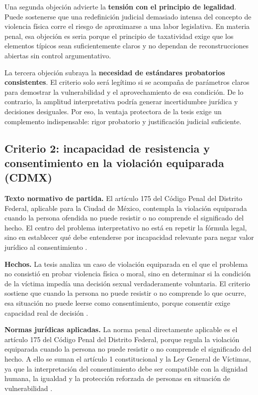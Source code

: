 \documentclass[
	spanish,
	letterpaper, oneside
]{article}
\begin{document}
Una segunda objeción advierte la \textbf{tensión con el principio de legalidad}. Puede sostenerse que una redefinición judicial demasiado intensa del concepto de violencia física corre el riesgo de aproximarse a una labor legislativa. En materia penal, esa objeción es seria porque el principio de taxatividad exige que los elementos típicos sean suficientemente claros y no dependan de reconstrucciones abiertas sin control argumentativo.

La tercera objeción subraya la \textbf{necesidad de estándares probatorios consistentes}. El criterio solo será legítimo si se acompaña de parámetros claros para demostrar la vulnerabilidad y el aprovechamiento de esa condición. De lo contrario, la amplitud interpretativa podría generar incertidumbre jurídica y decisiones desiguales. Por eso, la ventaja protectora de la tesis exige un complemento indispensable: rigor probatorio y justificación judicial suficiente.

\subsection{Criterio 2: incapacidad de resistencia y consentimiento en la violación equiparada (CDMX)}

\textbf{Texto normativo de partida.} El artículo 175 del Código Penal del Distrito Federal, aplicable para la Ciudad de México, contempla la violación equiparada cuando la persona ofendida no puede resistir o no comprende el significado del hecho. El centro del problema interpretativo no está en repetir la fórmula legal, sino en establecer qué debe entenderse por incapacidad relevante para negar valor jurídico al consentimiento \citep{scjnIncapacidadResistencia2019}.

\textbf{Hechos.} La tesis analiza un caso de violación equiparada en el que el problema no consistió en probar violencia física o moral, sino en determinar si la condición de la víctima impedía una decisión sexual verdaderamente voluntaria. El criterio sostiene que cuando la persona no puede resistir o no comprende lo que ocurre, esa situación no puede leerse como consentimiento, porque consentir exige capacidad real de decisión \citep{scjnIncapacidadResistencia2019}.

\textbf{Normas jurídicas aplicadas.} La norma penal directamente aplicable es el artículo 175 del Código Penal del Distrito Federal, porque regula la violación equiparada cuando la persona no puede resistir o no comprende el significado del hecho. A ello se suman el artículo 1 constitucional y la Ley General de Víctimas, ya que la interpretación del consentimiento debe ser compatible con la dignidad humana, la igualdad y la protección reforzada de personas en situación de vulnerabilidad \citep{cpeum2026,LeyGeneralVictimas}.
\end{document}
